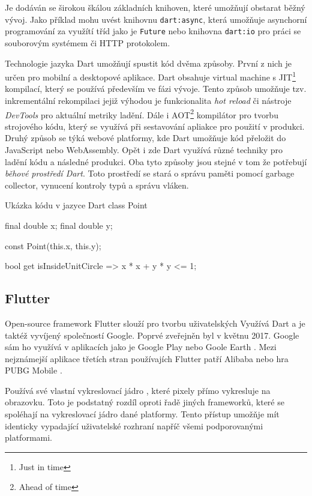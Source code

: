 \documentclass[
  biblatex,
  figures=true,
  tables=false,
  glossaries,
  index
]{kidiplom}
\begin{document}
Je dodáván se širokou škálou základních knihoven, které umožňují obstarat běžný vývoj. Jako příklad mohu uvést knihovnu \verb|dart:async|, která umožňuje asynchorní programování za využítí tříd jako je \verb|Future| nebo knihovna \verb|dart:io| pro práci se souborovým systémem či HTTP protokolem.

Technologie jazyka Dart umožňují spustit kód dvěma způsoby. První z nich je určen pro mobilní a desktopové aplikace. Dart obsahuje virtual machine s JIT\footnote{Just in time} kompilací, který se používá především ve fázi vývoje. Tento způsob umožňuje tzv. inkrementální rekompilaci jejiž výhodou je funkcionalita \textit{hot reload} či nástroje \textit{DevTools} pro aktuální metriky ladění. Dále i AOT\footnote{Ahead of time} kompilátor pro tvorbu strojového kódu, který se využívá při sestavování apliakce pro použití v produkci. Druhý způsob se týká webové platformy, kde Dart umožňuje kód přeložit do JavaScript nebo WebAssembly. Opět i zde Dart využívá různé techniky pro ladění kódu a následné produkci. Oba tyto způsoby jsou stejné v tom že potřebují \textit{běhové prostředí Dart}. Toto prostředí se stará o správu paměti pomocí garbage collector, vynucení kontroly typů a správu vláken.

\begin{kicode}{}{}{Ukázka kódu v jazyce Dart}
class Point {
  final double x;
  final double y;

  const Point(this.x, this.y);

  bool get isInsideUnitCircle => x * x + y * y <= 1;
}
\end{kicode}

\subsection{Flutter}
Open-source framework Flutter \cite{flutter} slouží pro tvorbu uživatelských Využívá Dart a je taktéž vyvíjený společností Google. Poprvé zveřejněn byl v květnu 2017. Google sám ho využívá v aplikacích jako je Google Play nebo Goole Earth \cite{flutter-showcase}. Mezi nejznámejší aplikace třetích stran používajích Flutter patří Alibaba nebo hra PUBG Mobile \cite{flutter-showcase}.

Používá své vlastní vykreslovací jádro \cite{flutter-architecture}, které pixely přímo vykresluje na obrazovku. Toto je podstatný rozdíl oproti řadě jiných frameworků, které se spoléhají na vykreslovací jádro dané platformy. Tento přístup umožňje mít identicky vypadající uživatelské rozhraní napříč všemi podporovanými platformami.
\end{document}
